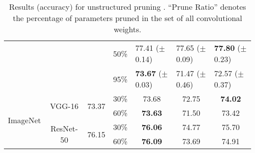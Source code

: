 \begin{table}[!htbp]
{\begin{tabular}{c|c|ccccc}
                                               &                                  &                                    & 50\%        & \multicolumn{1}{l}{77.41 ($\pm$0.14)}       & \multicolumn{1}{l}{77.65 ($\pm$0.09)}       & \multicolumn{1}{l}{\textbf{77.80} ($\pm$0.23)}                        \\                                       &                                  &                                    & 95\%        & \multicolumn{1}{l}{\textbf{73.67} ($\pm$0.03)}       & \multicolumn{1}{l}{71.47 ($\pm$0.46)}       & \multicolumn{1}{l}{72.57 ($\pm$0.37)}                        \\ \hline
\multirow{4}{*}{ImageNet}      
& \multirow{2}{*}{VGG-16}          & \multirow{2}{*}{73.37}             & 30\%        & \multicolumn{1}{c}{73.68}                        & \multicolumn{1}{c}{72.75}                        & \multicolumn{1}{c}{\textbf{74.02}}                        \\ 
                                              &                                  &                                    & 60\%        & \multicolumn{1}{c}{\textbf{73.63}}                        & \multicolumn{1}{c}{71.50}                        & \multicolumn{1}{c}{73.42}                        \\
                                              \cline{2-7} 
                                               & \multirow{2}{*}{ResNet-50}       & \multirow{2}{*}{76.15}             & 30\%            & \multicolumn{1}{c}{\textbf{76.06}}                        & \multicolumn{1}{c}{74.77}                        & \multicolumn{1}{c}{75.70}                        \\
                                              &                                  &                                    &    60\%         & \multicolumn{1}{c}{\textbf{76.09}}                        & \multicolumn{1}{c}{73.69}                        & \multicolumn{1}{c}{74.91}                        \\
                                               \hline
\end{tabular}
}
\vspace{2ex}
\caption{Results (accuracy) for unstructured pruning \citep{han2015learning}. ``Prune Ratio'' denotes the percentage of parameters pruned in the set of all convolutional weights. }
\label{weight-level}
\vspace{-4ex}
\end{table}


